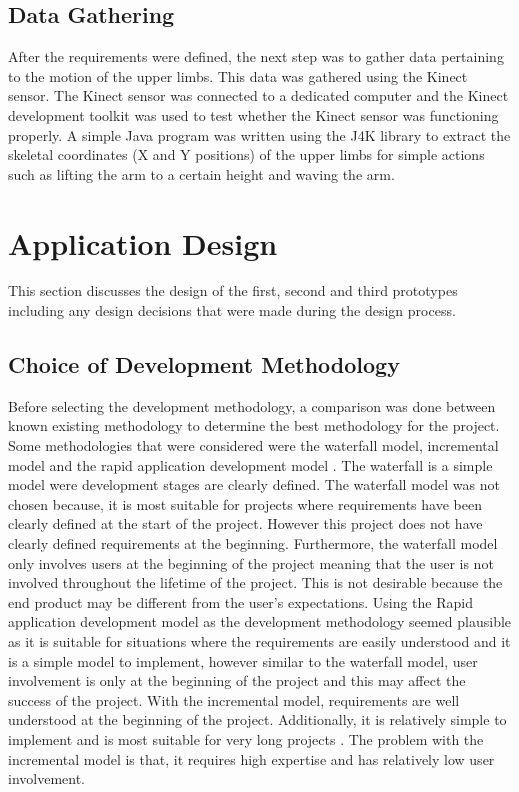\documentclass[a4paper, 12pt]{article}
\begin{document}
\subsection{Data Gathering}
After the requirements were defined, the next step was to gather data pertaining to the motion of the upper limbs. This data was gathered using the Kinect sensor. The Kinect sensor was connected to a dedicated computer and the Kinect development toolkit was used to test whether the Kinect sensor was functioning properly. A simple Java program was written using the J4K library to extract the skeletal coordinates (X and Y positions) of the upper limbs for simple actions such as lifting the arm to a certain height and waving the arm. 


\section{Application Design} 

This section discusses the design of the first, second and third prototypes including any design decisions that were made during the design process. 

\subsection{Choice of Development Methodology}

Before selecting the development methodology, a comparison was done between known existing methodology to determine the best methodology for the project. Some methodologies that were considered were the waterfall model, incremental model and the rapid application development model \citep{Sabale2012}. The waterfall is a simple model were development stages are clearly defined. The waterfall model was not chosen because, it is most suitable for projects where requirements have been clearly defined at the start of the project. However this project does not have clearly defined requirements at the beginning. Furthermore, the waterfall model only involves users at the beginning of the project meaning that the user is not involved throughout the lifetime of the project. This is not desirable because the end product may be different from the user's expectations.  Using the Rapid application development model as the development methodology seemed plausible as it is suitable for situations where the requirements are easily understood and it is a simple model to implement, however similar to the waterfall model, user involvement is only at the beginning of the project and this may affect the success of the project. With the incremental model, requirements are well understood at the beginning of the project. Additionally, it is relatively simple to implement and is most suitable for very long projects \citep{Sabale2012}. The problem with the incremental model is that, it requires high expertise and has relatively low user involvement.
\end{document}

